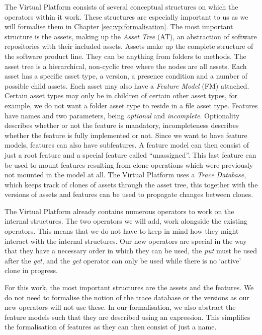 The Virtual Platform consists of several conceptual structures on which the
operators within it work. These structures are especially important to us as we
will formalise them in Chapter \ref{sec:vp:formalisation}. The most important
structure is the assets, making up the \emph{Asset Tree} (AT), an abstraction
of software repositories with their included assets. Assets make up
the complete structure of the software product line. They can be anything from
folders to methods. The asset tree is a hierarchical, non-cyclic tree where the 
nodes are all assets. Each asset has a specific asset type, a version, a presence
condition and a number of possible child assets. Each asset may also have a
\emph{Feature Model} (FM) attached. 
Certain asset types may only be in children of certain other asset types, for
example, we do not want a folder asset type to reside in a file asset type.
Features have names and two parameters, being \emph{optional} and
\emph{incomplete}. Optionality describes whether or not the feature is
mandatory, incompleteness describes whether the feature is fully implemented or
not. Since we want to have feature models, features can also have subfeatures. 
A feature model can then consist of just a root feature and a special
feature called ``unassigned''. This last feature can be used to mount features
resulting from clone operations which were previously not mounted in the model
at all. The Virtual Platform uses a \emph{Trace Database}, which keeps track of
clones of assets through the asset tree, this together with the versions of assets
and features can be used to propagate changes between clones.

The Virtual Platform already contains numerous operators to work on the internal
structures. The two operators we will add, work alongside the existing operators.
This means that we do not have to keep in mind how they might interact with the
internal structures. Our new operators are special in the way that they have a
necessary order in which they can be used, the \emph{put} must be used after the
\emph{get}, and the \emph{get} operator can only be used while there is no `active'
clone in progress.

For this work, the most important structures are the assets and the features.
We do not need to formalise the notion of the trace database or the versions as
our new operators will not use these. In our formalisation, we also abstract the
feature models such that they are described using an expression. This
simplifies the formalisation of features as they can then consist of just a
name.

